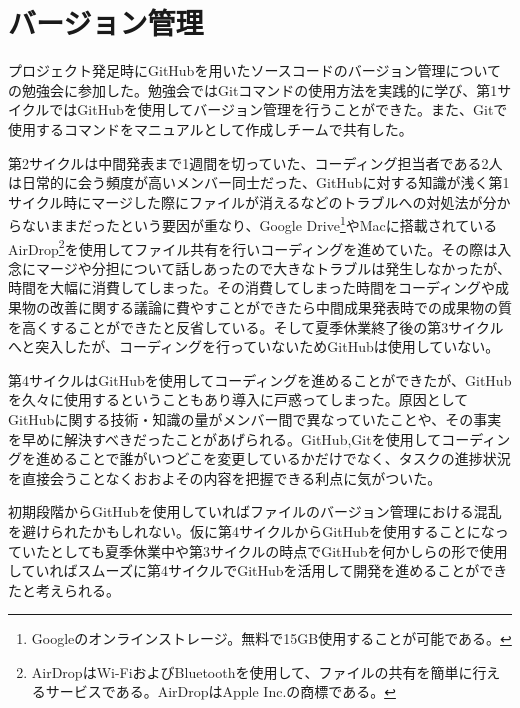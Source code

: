 \section{バージョン管理}
プロジェクト発足時にGitHubを用いたソースコードのバージョン管理についての勉強会に参加した。勉強会ではGitコマンドの使用方法を実践的に学び、第1サイクルではGitHubを使用してバージョン管理を行うことができた。また、Gitで使用するコマンドをマニュアルとして作成しチームで共有した。
\par 第2サイクルは中間発表まで1週間を切っていた、コーディング担当者である2人は日常的に会う頻度が高いメンバー同士だった、GitHubに対する知識が浅く第1サイクル時にマージした際にファイルが消えるなどのトラブルへの対処法が分からないままだったという要因が重なり、Google Drive\footnote{Googleのオンラインストレージ。無料で15GB使用することが可能である。}やMacに搭載されているAirDrop\footnote{AirDropはWi-FiおよびBluetoothを使用して、ファイルの共有を簡単に行えるサービスである。AirDropはApple Inc.の商標である。}を使用してファイル共有を行いコーディングを進めていた。その際は入念にマージや分担について話しあったので大きなトラブルは発生しなかったが、時間を大幅に消費してしまった。その消費してしまった時間をコーディングや成果物の改善に関する議論に費やすことができたら中間成果発表時での成果物の質を高くすることができたと反省している。そして夏季休業終了後の第3サイクルへと突入したが、コーディングを行っていないためGitHubは使用していない。
\par 第4サイクルはGitHubを使用してコーディングを進めることができたが、GitHubを久々に使用するということもあり導入に戸惑ってしまった。原因としてGitHubに関する技術・知識の量がメンバー間で異なっていたことや、その事実を早めに解決すべきだったことがあげられる。GitHub,Gitを使用してコーディングを進めることで誰がいつどこを変更しているかだけでなく、タスクの進捗状況を直接会うことなくおおよその内容を把握できる利点に気がついた。
\par  初期段階からGitHubを使用していればファイルのバージョン管理における混乱を避けられたかもしれない。仮に第4サイクルからGitHubを使用することになっていたとしても夏季休業中や第3サイクルの時点でGitHubを何かしらの形で使用していればスムーズに第4サイクルでGitHubを活用して開発を進めることができたと考えられる。

